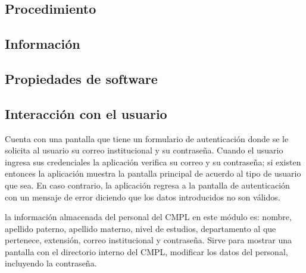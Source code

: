 \subsection{Procedimiento}

\subsection{Información}

\subsection{Propiedades de software}

\subsection{Interacción con el usuario}
Cuenta con una pantalla que tiene un formulario de autenticación donde se le solicita al usuario su correo institucional y su contraseña. Cuando el usuario ingresa sus credenciales la aplicación verifica su correo y su contraseña; si existen entonces la aplicación muestra la pantalla principal de acuerdo al tipo de usuario que sea. En caso contrario, la aplicación regresa a la pantalla de autenticación con un mensaje de error diciendo que los datos introducidos no son válidos.

la información almacenada del personal del CMPL en este módulo es: nombre, apellido paterno, apellido materno, nivel de estudios, departamento al que pertenece, extensión, correo institucional y contraseña. Sirve para mostrar una pantalla con el directorio interno del CMPL, modificar los datos del personal, incluyendo la contraseña.\\

